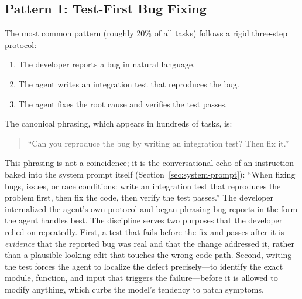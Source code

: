 \documentclass{article}
\begin{document}
\subsection{Pattern 1: Test-First Bug Fixing}
\label{sec:p-test-first}

The most common pattern (roughly 20\% of all tasks) follows a
rigid three-step protocol:

\begin{enumerate}[nosep]
  \item The developer reports a bug in natural language.
  \item The agent writes an integration test that reproduces the bug.
  \item The agent fixes the root cause and verifies the test passes.
\end{enumerate}

\noindent The canonical phrasing, which appears in hundreds of tasks, is:
\begin{quote}\small
``Can you reproduce the bug by writing an integration test?
Then fix it.''
\end{quote}

This phrasing is not a coincidence; it is the conversational echo of
an instruction baked into the system prompt itself
(Section~\ref{sec:system-prompt}): ``When fixing bugs, issues, or
race conditions: write an integration test that reproduces the
problem first, then fix the code, then verify the test passes.''
The developer internalized the agent's own protocol and began phrasing
bug reports in the form the agent handles best.
The discipline serves two purposes that the developer relied on
repeatedly.
First, a test that fails before the fix and passes after it is
\emph{evidence} that the reported bug was real and that the change
addressed it, rather than a plausible-looking edit that touches the
wrong code path.
Second, writing the test forces the agent to localize the defect
precisely---to identify the exact module, function, and input that
triggers the failure---before it is allowed to modify anything,
which curbs the model's tendency to patch symptoms.
\end{document}
